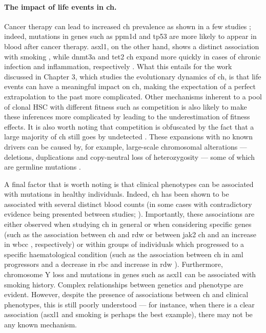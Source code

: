 \paragraph{The impact of life events in \ac{ch}.} Cancer therapy can lead to increased \ac{ch} prevalence as shown in a few studies \cite{Bolton2020-ct,Zehir2017-gh}; indeed, mutations in genes such as \ac{ppm1d} and \ac{tp53} are more likely to appear in blood after cancer therapy. \Ac{asxl1}, on the other hand, shows a distinct association with smoking \cite{Dawoud2020-af}, while \ac{dnmt3a} and \ac{tet2} \ac{ch} expand more quickly in cases of chronic infection and inflammation, respectively \cite{Hormaechea-Agulla2021-kr,Cook2020-xs}. What this entails for the work discussed in Chapter 3, which studies the evolutionary dynamics of \ac{ch}, is that life events can have a meaningful impact on \ac{ch}, making the expectation of a perfect extrapolation to the past more complicated. Other mechanisms inherent to a pool of clonal HSC with different fitness such as competition is also likely to make these inferences more complicated \cite{Beerenwinkel2007-us} by leading to the underestimation of fitness effects. It is also worth noting that competition is obfuscated by the fact that a large majority of \ac{ch} still goes by undetected \cite{Poon2020-ek,Zink2017-zi,Genovese2014-eu}. These expansions with no known drivers can be caused by, for example, large-scale chromosomal alterations --- deletions, duplications and copy-neutral loss of heterozygosity --- some of which are germline mutations \cite{Loh2020-vz,Loh2018-xp,Gao2021-ph,Terao2020-dd}.

A final factor that is worth noting is that clinical phenotypes can be associated with mutations in healthy individuals. Indeed, \ac{ch} has been shown to be associated with several distinct blood counts (in some cases with contradictory evidence being presented between studies; ). Importantly, these associations are either observed when studying \ac{ch} in general or when considering specific genes (such as the association between \ac{ch} and \ac{rdw} \cite{Jaiswal2014-rl,Dawoud2020-af} or between \ac{jak2} \ac{ch} and an increase in \ac{wbcc} \cite{Cordua2019-mo}, respectively) or within groups of individuals which progressed to a specific haematological condition (such as the association between \ac{ch} in \ac{aml} progressors and a decrease in \ac{rbc} and increase in \ac{rdw} \cite{Abelson2018-wh}). Furthermore, chromosome Y loss \cite{Dumanski2015-ze} and mutations in genes such as \ac{asxl1} \cite{Dawoud2020-af} can be associated with smoking history. Complex relationships between genetics and phenotype are evident. However, despite the presence of associations between \ac{ch} and clinical phenotypes, this is still poorly understood --- for instance, when there is a clear association (\ac{asxl1} and smoking is perhaps the best example), there may not be any known mechanism.

